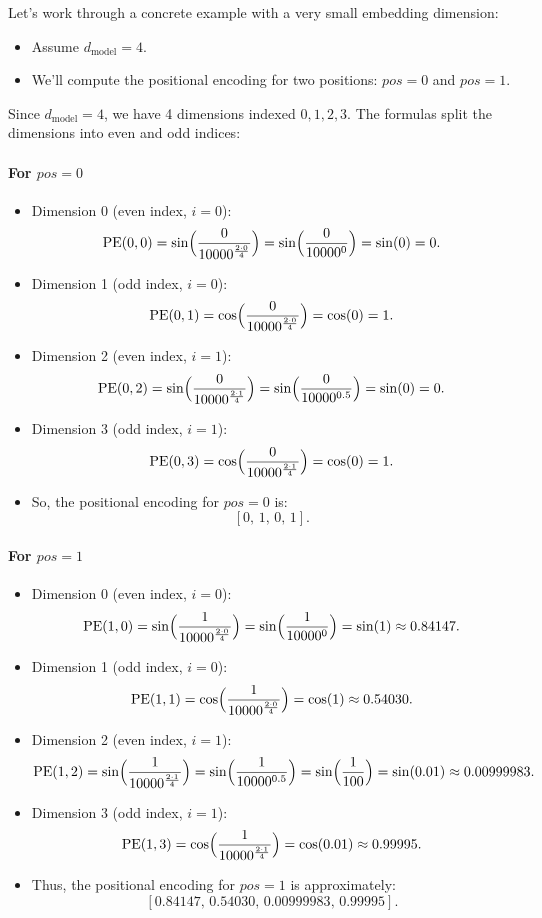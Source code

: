 Let's work through a concrete example with a very small embedding dimension:
\begin{itemize}
	\item Assume \( d_{\text{model}} = 4 \).  
	\item We’ll compute the positional encoding for two positions: \( pos = 0 \) and \( pos = 1 \).
\end{itemize}

Since \( d_{\text{model}} = 4 \), we have 4 dimensions indexed \(0, 1, 2, 3\). The formulas split the dimensions into even and odd indices:

\paragraph{For \( pos = 0 \)}
\begin{itemize}
\item Dimension 0 (even index, \( i = 0 \)):
 \[
 \text{PE}(0,0) = \sin\Bigl(\frac{0}{10000^{\frac{2\cdot0}{4}}}\Bigr) = \sin\Bigl(\frac{0}{10000^0}\Bigr) = \sin(0) = 0.
 \]
\item Dimension 1 (odd index, \( i = 0 \)):
 \[
 \text{PE}(0,1) = \cos\Bigl(\frac{0}{10000^{\frac{2\cdot0}{4}}}\Bigr) = \cos(0) = 1.
 \]
\item Dimension 2 (even index, \( i = 1 \)):
 \[
 \text{PE}(0,2) = \sin\Bigl(\frac{0}{10000^{\frac{2\cdot1}{4}}}\Bigr) = \sin\Bigl(\frac{0}{10000^{0.5}}\Bigr) = \sin(0) = 0.
 \]

\item Dimension 3 (odd index, \( i = 1 \)):
 \[
 \text{PE}(0,3) = \cos\Bigl(\frac{0}{10000^{\frac{2\cdot1}{4}}}\Bigr) = \cos(0) = 1.
 \]
\item So, the positional encoding for \( pos = 0 \) is:
\[
[0,\, 1,\, 0,\, 1].
\]
\end{itemize}

\paragraph{For \( pos = 1 \)}
\begin{itemize}
\item Dimension 0 (even index, \( i = 0 \)):
\[
\text{PE}(1,0) = \sin\Bigl(\frac{1}{10000^{\frac{2\cdot0}{4}}}\Bigr) = \sin\Bigl(\frac{1}{10000^0}\Bigr) = \sin(1) \approx 0.84147.
\]

\item Dimension 1 (odd index, \( i = 0 \)):
\[
\text{PE}(1,1) = \cos\Bigl(\frac{1}{10000^{\frac{2\cdot0}{4}}}\Bigr) = \cos(1) \approx 0.54030.
\]
\item Dimension 2 (even index, \( i = 1 \)):
\[
\text{PE}(1,2) = \sin\Bigl(\frac{1}{10000^{\frac{2\cdot1}{4}}}\Bigr) = \sin\Bigl(\frac{1}{10000^{0.5}}\Bigr) = \sin\Bigl(\frac{1}{100}\Bigr) = \sin(0.01) \approx 0.00999983.
\]

\item Dimension 3 (odd index, \( i = 1 \)):
\[
\text{PE}(1,3) = \cos\Bigl(\frac{1}{10000^{\frac{2\cdot1}{4}}}\Bigr) = \cos(0.01) \approx 0.99995.
\]
\item Thus, the positional encoding for \( pos = 1 \) is approximately:
\[
[0.84147,\, 0.54030,\, 0.00999983,\, 0.99995].
\]
\end{itemize}


